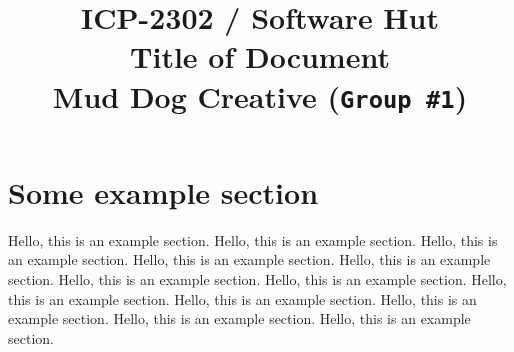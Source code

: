 \documentclass[pdftex,a4paper,10pt,titlepage]{article}
\begin{document}
\title{\textbf{ICP-2302 / Software Hut} \\
Title of Document \\ 
Mud Dog Creative (\texttt{Group \#1})}

\maketitle



\pagebreak




\pagestyle{fancy}
\fancyhf{}
\cfoot{\thepage}

\tableofcontents
\pagebreak


\section{Some example section}
Hello, this is an example section. Hello, this is an example section. Hello, this is an example section. Hello, this is an example section. Hello, this is an example section. Hello, this is an example section. Hello, this is an example section. Hello, this is an example section. Hello, this is an example section. Hello, this is an example section. Hello, this is an example section. Hello, this is an example section. \\




\end{document}
